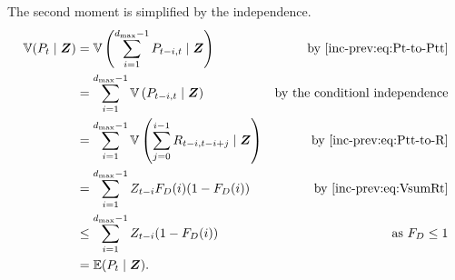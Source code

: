 \documentclass[thesis.tex]{subfiles}
\begin{document}
The second moment is simplified by the independence.
\begin{align}
\V(P_t \mid \vec{Z})
  &= \V\left(\sum_{i=1}^{d_\text{max}-1} P_{t-i,t} \mid \vec{Z} \right) &\text{by \cref{inc-prev:eq:Pt-to-Ptt}} \\
  &= \sum_{i=1}^{d_\text{max}-1} \V\left(P_{t-i,t} \mid \vec{Z} \right) &\text{by the conditionl independence} \\
  &= \sum_{i=1}^{d_\text{max}-1} \V\left(\sum_{j=0}^{i-1} R_{t-i,t-i+j} \mid \vec{Z} \right) &\text{by~\cref{inc-prev:eq:Ptt-to-R}}\\
  &= \sum_{i=1}^{d_\text{max}-1} Z_{t-i} F_D(i) (1 - F_D(i)) &\text{by~\cref{inc-prev:eq:VsumRt}} \\
  &\leq \sum_{i=1}^{d_\text{max}-1} Z_{t-i} (1 - F_D(i)) &\text{as $F_D \leq 1$}\\
  &= \E(P_t \mid \vec{Z}). \label{inc-prev:eq:boundVPt}
\end{align}


\end{document}

